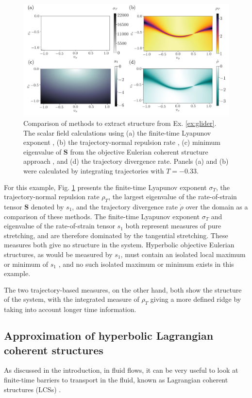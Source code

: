 \documentclass[twocolumn]{svjour3}
\begin{document}
\begin{figure}
\centering
\includegraphics[width=\linewidth]{Fig13}
\caption{Comparison of methods to extract structure from Ex. \ref{ex:glider}. The scalar field calculations using (a) the finite-time Lyapunov exponent \cite{shadden2005definition}, (b) the trajectory-normal repulsion rate \cite{haller_variational_2011}, (c) minimum eigenvalue of $\mathbf{S}$ from the objective Eulerian coherent structure approach \cite{serra_objective_2016}, and (d) the trajectory divergence rate. Panels (a) and (b) were calculated by integrating trajectories with $T=-0.33$.}
\label{fig:method-comparison}
\end{figure}

For this example, Fig. \ref{fig:method-comparison} presents the finite-time Lyapunov exponent $\sigma_T$, the trajectory-normal repulsion rate $\rho_T$, the largest eigenvalue of the rate-of-strain tensor $\mathbf{S}$ denoted by $s_1$, and the trajectory divergence rate $\dot{\rho}$ over the domain as a comparison of these methods. The finite-time Lyapunov exponent $\sigma_T$ and eigenvalue of the rate-of-strain tensor $s_1$ both represent measures of pure stretching, and are therefore dominated by the tangential stretching. These measures both give no structure in the system. Hyperbolic objective Eulerian structures, as would be measured by $s_1$, must contain an isolated local maximum or minimum of $s_1$ \cite{serra_objective_2016}, and no such isolated maximum or minimum exists in this example. 

The two trajectory-based measures, on the other hand, both show the structure of the system, with the integrated measure of $\rho_T$ giving a more defined ridge by taking into account longer time information.

\subsection{Approximation of hyperbolic Lagrangian coherent structures}\label{ss:LCSapprox}
As discussed in the introduction, in fluid flows, it can be very useful to look at finite-time barriers to transport in the fluid, known as Lagrangian coherent structures (LCSs) \cite{shadden2005definition}.
\end{document}
